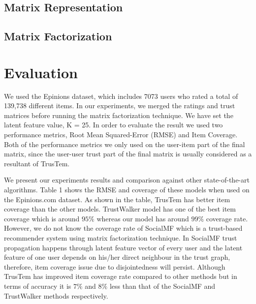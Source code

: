 \documentclass[11pt, conference, onecolumn]{IEEEtran}
\begin{document}
\subsection{Matrix Representation}

\subsection{Matrix Factorization}

\section{Evaluation}
We used the Epinions dataset, which includes 7073 users who rated a total of 139,738 different items. In our experiments, we merged the ratings and trust matrices before running the matrix factorization technique. We have set the latent feature value, K = 25. In order to evaluate the result we used two performance metrics, Root Mean Squared-Error (RMSE) and Item Coverage. Both of the performance metrics we only used on the user-item part of the final matrix, since the user-user trust part of the final matrix is usually considered as a resultant of TrusTem.

We present our experiments results and comparison against other state-of-the-art algorithms. Table 1 shows the RMSE and coverage of these models when used on the Epinions.com dataset. 
As shown in the table, TrusTem has better item coverage than the other models. TrustWalker model has one of the best item coverage which is around $95\%$ whereas our model has around $99\%$ coverage rate. However, we do not know the coverage rate of SocialMF which is a trust-based recommender system using matrix factorization technique. In SocialMF trust propagation happens through latent feature vector of every user and the latent feature of one user depends on his/her direct neighbour in the trust graph, therefore, item coverage issue due to disjointedness will persist. Although TrusTem has improved item coverage rate compared to other methods but in terms of accuracy it is $7\%$ and $8\%$ less than that of the SocialMF and TrustWalker methods respectively.
\end{document}
